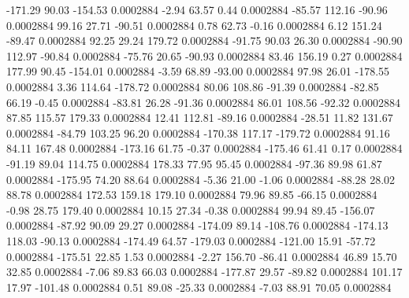      -171.29       90.03     -154.53     0.0002884
       -2.94       63.57        0.44     0.0002884
      -85.57      112.16      -90.96     0.0002884
       99.16       27.71      -90.51     0.0002884
        0.78       62.73       -0.16     0.0002884
        6.12      151.24      -89.47     0.0002884
       92.25       29.24      179.72     0.0002884
      -91.75       90.03       26.30     0.0002884
      -90.90      112.97      -90.84     0.0002884
      -75.76       20.65      -90.93     0.0002884
       83.46      156.19        0.27     0.0002884
      177.99       90.45     -154.01     0.0002884
       -3.59       68.89      -93.00     0.0002884
       97.98       26.01     -178.55     0.0002884
        3.36      114.64     -178.72     0.0002884
       80.06      108.86      -91.39     0.0002884
      -82.85       66.19       -0.45     0.0002884
      -83.81       26.28      -91.36     0.0002884
       86.01      108.56      -92.32     0.0002884
       87.85      115.57      179.33     0.0002884
       12.41      112.81      -89.16     0.0002884
      -28.51       11.82      131.67     0.0002884
      -84.79      103.25       96.20     0.0002884
     -170.38      117.17     -179.72     0.0002884
       91.16       84.11      167.48     0.0002884
     -173.16       61.75       -0.37     0.0002884
     -175.46       61.41        0.17     0.0002884
      -91.19       89.04      114.75     0.0002884
      178.33       77.95       95.45     0.0002884
      -97.36       89.98       61.87     0.0002884
     -175.95       74.20       88.64     0.0002884
       -5.36       21.00       -1.06     0.0002884
      -88.28       28.02       88.78     0.0002884
      172.53      159.18      179.10     0.0002884
       79.96       89.85      -66.15     0.0002884
       -0.98       28.75      179.40     0.0002884
       10.15       27.34       -0.38     0.0002884
       99.94       89.45     -156.07     0.0002884
      -87.92       90.09       29.27     0.0002884
     -174.09       89.14     -108.76     0.0002884
     -174.13      118.03      -90.13     0.0002884
     -174.49       64.57     -179.03     0.0002884
     -121.00       15.91      -57.72     0.0002884
     -175.51       22.85        1.53     0.0002884
       -2.27      156.70      -86.41     0.0002884
       46.89       15.70       32.85     0.0002884
       -7.06       89.83       66.03     0.0002884
     -177.87       29.57      -89.82     0.0002884
      101.17       17.97     -101.48     0.0002884
        0.51       89.08      -25.33     0.0002884
       -7.03       88.91       70.05     0.0002884
